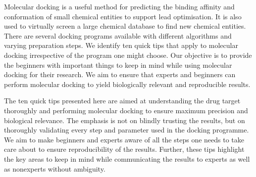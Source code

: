 %
Molecular docking is a useful method for predicting the binding affinity and conformation of small chemical entities to support lead optimisation. It is also used to virtually screen a large chemical database to find new chemical entities. There are several docking programs available with different algorithms and varying preparation steps. We identify ten quick tips that apply to molecular docking irrespective of the program one might choose. Our objective is to provide the beginners with important things to keep in mind while using molecular docking for their research. We aim to ensure that experts and beginners can perform molecular docking to yield biologically relevant and reproducible results. 

%
The ten quick tips presented here are aimed at understanding the drug target thoroughly and performing molecular docking to ensure maximum precision and biological relevance. The emphasis is not on blindly trusting the results, but on thoroughly validating every step and parameter used in the docking programme. We aim to make beginners and experts aware of all the steps one needs to take care about to ensure reproducibility of the results. Further, these tips highlight the key areas to keep in mind while communicating the results to experts as well as nonexperts without ambiguity. 


